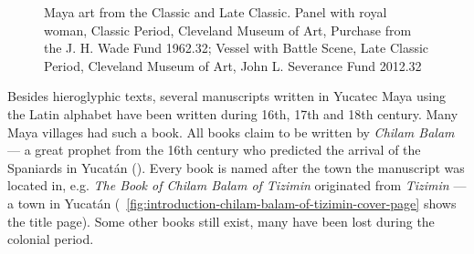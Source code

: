 \documentclass[../main.tex]{subfiles}
\begin{document}
\begin{figure}
    \centering
    \caption[Maya art from the Classic and Late Classic]{Maya art from the Classic and Late Classic.
              Panel with royal woman, 
             Classic Period, Cleveland Museum of Art, Purchase from the J. H. Wade Fund 1962.32;
              Vessel with Battle Scene, 
             Late Classic Period, Cleveland Museum of Art, John L. Severance Fund 2012.32}
\end{figure}

Besides hieroglyphic texts, several manuscripts written in Yucatec Maya using the Latin alphabet 
have been written  during 16th, 17th and 18th century.
Many Maya villages had such a book.
All books claim to be written by \emph{Chilam Balam} --- a great prophet from the 16th century
who predicted the arrival of the Spaniards in Yucat\'{a}n
().
Every book is named after the town the manuscript was located in, e.g. 
\emph{The Book of Chilam Balam of Tizimin} originated from \emph{Tizimin} --- a town 
in Yucat\'{a}n
(~\ref{fig:introduction-chilam-balam-of-tizimin-cover-page} shows the title page).
Some other books still exist, many have been lost during the colonial period.
\end{document}
